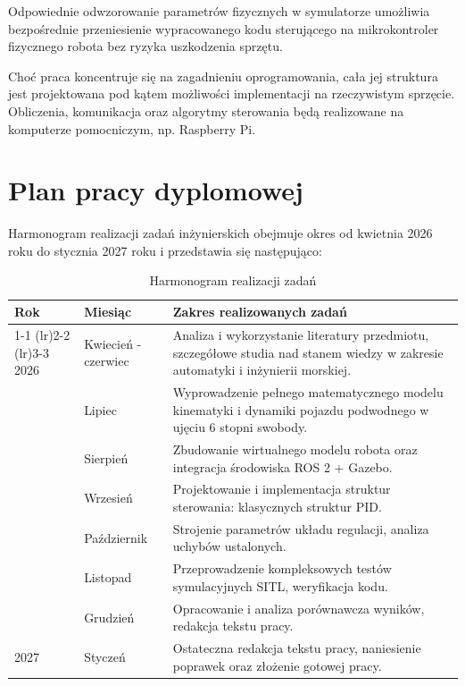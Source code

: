 Odpowiednie odwzorowanie parametrów fizycznych w symulatorze umożliwia bezpośrednie przeniesienie wypracowanego kodu sterującego na mikrokontroler fizycznego robota bez ryzyka uszkodzenia sprzętu.

Choć praca koncentruje się na zagadnieniu oprogramowania, cała jej struktura jest projektowana pod kątem możliwości implementacji na rzeczywistym sprzęcie. Obliczenia, komunikacja oraz algorytmy sterowania będą realizowane na komputerze pomocniczym, np. Raspberry Pi.

\section{Plan pracy dyplomowej}
Harmonogram realizacji zadań inżynierskich obejmuje okres od kwietnia 2026 roku do stycznia 2027 roku i przedstawia się następująco:

\newpage

\begin{table}[hbtp]
    \centering
    \renewcommand{\arraystretch}{1.5} %
    \caption{Harmonogram realizacji zadań}
    \label{tab:harmonogram}
    \vspace{0.5em}
    \begin{tabular}{llp{10cm}}
        \toprule
        \textbf{Rok} & \textbf{Miesiąc} & \textbf{Zakres realizowanych zadań} \\
        \cmidrule(lr){1-1} \cmidrule(lr){2-2} \cmidrule(lr){3-3} %
        2026 & Kwiecień - czerwiec   & Analiza i wykorzystanie literatury przedmiotu, szczegółowe studia nad stanem wiedzy w zakresie automatyki i inżynierii morskiej. \\
             & Lipiec     & Wyprowadzenie pełnego matematycznego modelu kinematyki i dynamiki pojazdu podwodnego w ujęciu 6 stopni swobody. \\
             & Sierpień   & Zbudowanie wirtualnego modelu robota oraz integracja środowiska ROS 2 + Gazebo. \\
             & Wrzesień   & Projektowanie i implementacja struktur sterowania: klasycznych struktur PID. \\
             & Październik & Strojenie parametrów układu regulacji, analiza uchybów ustalonych. \\
             & Listopad   & Przeprowadzenie kompleksowych testów symulacyjnych SITL, weryfikacja kodu. \\
             & Grudzień   & Opracowanie i analiza porównawcza wyników, redakcja tekstu pracy. \\
        \midrule %
        2027 & Styczeń    & Ostateczna redakcja tekstu pracy, naniesienie poprawek oraz złożenie gotowej pracy. \\
        \bottomrule
    \end{tabular}
\end{table}

